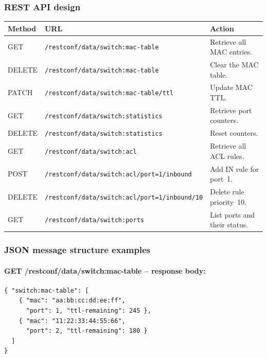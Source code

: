 \documentclass[12pt,a4paper]{article}
\begin{document}
\subsubsection{REST API design}

\begin{center}
\begin{tabular}{p{1.2cm}p{6.5cm}p{5.0cm}}
\toprule
\textbf{Method} & \textbf{URL}                                           & \textbf{Action} \\
\midrule
GET    & \texttt{/restconf/data/switch:mac-table}               & Retrieve all MAC entries. \\
DELETE & \texttt{/restconf/data/switch:mac-table}               & Clear the MAC table. \\
PATCH  & \texttt{/restconf/data/switch:mac-table/ttl}           & Update MAC TTL. \\
GET    & \texttt{/restconf/data/switch:statistics}              & Retrieve port counters. \\
DELETE & \texttt{/restconf/data/switch:statistics}              & Reset counters. \\
GET    & \texttt{/restconf/data/switch:acl}                     & Retrieve all ACL rules. \\
POST   & \texttt{/restconf/data/switch:acl/port=1/inbound}      & Add IN rule for port~1. \\
DELETE & \texttt{/restconf/data/switch:acl/port=1/inbound/10}   & Delete rule priority~10. \\
GET    & \texttt{/restconf/data/switch:ports}                   & List ports and their status. \\
\bottomrule
\end{tabular}
\end{center}

\subsubsection{JSON message structure examples}

\paragraph{GET /restconf/data/switch:mac-table -- response body:}

\begin{verbatim}
{ "switch:mac-table": [
    { "mac": "aa:bb:cc:dd:ee:ff",
      "port": 1, "ttl-remaining": 245 },
    { "mac": "11:22:33:44:55:66",
      "port": 2, "ttl-remaining": 180 }
  ]
}
\end{verbatim}
\end{document}
